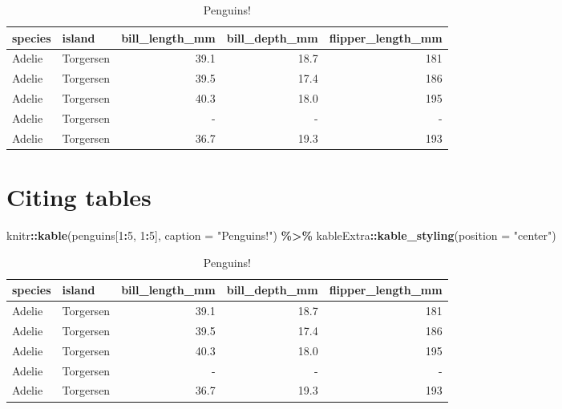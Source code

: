 \documentclass[
]{article}
\newenvironment{Shaded}{\begin{snugshade}}{\end{snugshade}}
\newcommand{\AttributeTok}[1]{\textcolor[rgb]{0.13,0.29,0.53}{#1}}
\newcommand{\DecValTok}[1]{\textcolor[rgb]{0.00,0.00,0.81}{#1}}
\newcommand{\FunctionTok}[1]{\textcolor[rgb]{0.13,0.29,0.53}{\textbf{#1}}}
\newcommand{\NormalTok}[1]{#1}
\newcommand{\SpecialCharTok}[1]{\textcolor[rgb]{0.81,0.36,0.00}{\textbf{#1}}}
\newcommand{\StringTok}[1]{\textcolor[rgb]{0.31,0.60,0.02}{#1}}
\begin{document}
\begingroup\fontsize{7}{9}\selectfont

\begin{longtable}[l]{llrrr}
\caption{\label{tab:unnamed-chunk-2}Penguins!}\\
\toprule
species & island & bill\_length\_mm & bill\_depth\_mm & flipper\_length\_mm\\
\midrule
Adelie & Torgersen & 39.1 & 18.7 & 181\\
Adelie & Torgersen & 39.5 & 17.4 & 186\\
Adelie & Torgersen & 40.3 & 18.0 & 195\\
Adelie & Torgersen & - & - & -\\
Adelie & Torgersen & 36.7 & 19.3 & 193\\
\bottomrule
\end{longtable}
\endgroup{}

\section{Citing tables}\label{citing-tables}

\begin{Shaded}
\begin{Highlighting}[]
\NormalTok{knitr}\SpecialCharTok{::}\FunctionTok{kable}\NormalTok{(penguins[}\DecValTok{1}\SpecialCharTok{:}\DecValTok{5}\NormalTok{, }\DecValTok{1}\SpecialCharTok{:}\DecValTok{5}\NormalTok{], }\AttributeTok{caption =} \StringTok{"Penguins!"}\NormalTok{) }\SpecialCharTok{\%\textgreater{}\%}
\NormalTok{  kableExtra}\SpecialCharTok{::}\FunctionTok{kable\_styling}\NormalTok{(}\AttributeTok{position =} \StringTok{"center"}\NormalTok{)}
\end{Highlighting}
\end{Shaded}

\begin{longtable}[t]{llrrr}
\caption{\label{tab:penguinTable}Penguins!}\\
\toprule
species & island & bill\_length\_mm & bill\_depth\_mm & flipper\_length\_mm\\
\midrule
Adelie & Torgersen & 39.1 & 18.7 & 181\\
Adelie & Torgersen & 39.5 & 17.4 & 186\\
Adelie & Torgersen & 40.3 & 18.0 & 195\\
Adelie & Torgersen & - & - & -\\
Adelie & Torgersen & 36.7 & 19.3 & 193\\
\bottomrule
\end{longtable}
\end{document}
